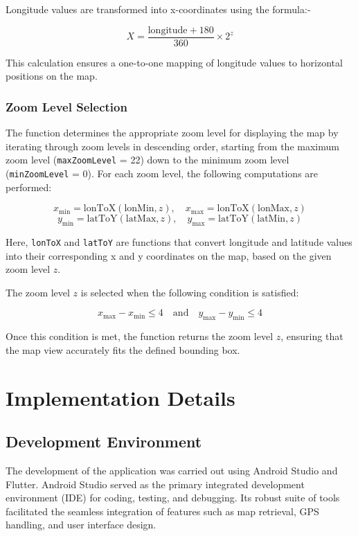 \documentclass[conference]{IEEEtran}
\begin{document}
Longitude values are transformed into x-coordinates using the formula:-
   
   \[
   X = \frac{\text{longitude} + 180}{360} \times 2^z
   \]

This calculation ensures a one-to-one mapping of longitude values to horizontal positions on the map.


\subsubsection{Zoom Level Selection}

The function determines the appropriate zoom level for displaying the map by iterating through zoom levels in descending order, starting from the maximum zoom level (\texttt{maxZoomLevel} = 22) down to the minimum zoom level (\texttt{minZoomLevel} = 0). For each zoom level, the following computations are performed:

\[
x_{\text{min}} = \text{lonToX}(\text{lonMin}, z), \quad x_{\text{max}} = \text{lonToX}(\text{lonMax}, z)
\]
\[
y_{\text{min}} = \text{latToY}(\text{latMax}, z), \quad y_{\text{max}} = \text{latToY}(\text{latMin}, z)
\]

Here, \texttt{lonToX} and \texttt{latToY} are functions that convert longitude and latitude values into their corresponding x and y coordinates on the map, based on the given zoom level \( z \).

The zoom level \( z \) is selected when the following condition is satisfied:

\[
x_{\text{max}} - x_{\text{min}} \leq 4 \quad \text{and} \quad y_{\text{max}} - y_{\text{min}} \leq 4
\]

Once this condition is met, the function returns the zoom level \( z \), ensuring that the map view accurately fits the defined bounding box.


\section{Implementation Details}

\subsection{Development Environment}

The development of the application was carried out using Android Studio and Flutter. Android Studio served as the primary integrated development environment (IDE) for coding, testing, and debugging. Its robust suite of tools facilitated the seamless integration of features such as map retrieval, GPS handling, and user interface design.
\end{document}
